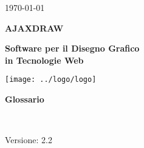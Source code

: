 
\title{\TITOLODOC}
\author{Mirco Geremia}



\renewcommand{\insertversion}{2.2} %
\renewcommand{\TITOLODOC}{Glossario} %
\renewcommand{\glosspath}{.\glossario} %

\begin{titlepage}
\begin{center}
	\begin{Large}	\today \end{Large}
\end{center}

\vspace{20pt}

\begin{center}
	\begin{Huge}
				\textbf{AJAXDRAW}
	\end{Huge}
\end{center}			

\begin{center}
	\begin{large}
				\textbf{Software per il Disegno Grafico\\ in Tecnologie Web}
	\end{large}
\end{center}			

\vspace{20pt}

\begin{center}
\texttt{[image: ../logo/logo]}
\end{center}

\vspace{170pt}
\begin{center} %
	\begin{Huge}
				\textbf{\TITOLODOC}
	\end{Huge}
			\\
\end{center}
\vspace{200pt}
\begin{center}
Versione: \insertversion
\end{center}
\end{titlepage}

